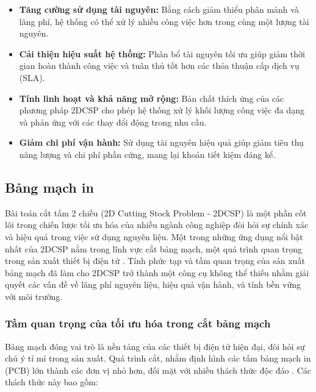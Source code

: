 \begin{itemize}
    \item \textbf{Tăng cường sử dụng tài nguyên:} Bằng cách giảm thiểu phân mảnh và lãng phí, hệ thống có thể xử lý nhiều công việc hơn trong cùng một lượng tài nguyên.  
    \item \textbf{Cải thiện hiệu suất hệ thống:} Phân bổ tài nguyên tối ưu giúp giảm thời gian hoàn thành công việc và tuân thủ tốt hơn các thỏa thuận cấp dịch vụ (SLA).  
    \item \textbf{Tính linh hoạt và khả năng mở rộng:} Bản chất thích ứng của các phương pháp 2DCSP cho phép hệ thống xử lý khối lượng công việc đa dạng và phản ứng với các thay đổi động trong nhu cầu.  
    \item \textbf{Giảm chi phí vận hành:} Sử dụng tài nguyên hiệu quả giúp giảm tiêu thụ năng lượng và chi phí phần cứng, mang lại khoản tiết kiệm đáng kể.  
\end{itemize}  


\subsection{Bảng mạch in}

\hspace{0.5cm}Bài toán cắt tấm 2 chiều (2D Cutting Stock Problem - 2DCSP) là một phần cốt lõi trong chiến lược tối ưu hóa của nhiều ngành công nghiệp đòi hỏi sự chính xác và hiệu quả trong việc sử dụng nguyên liệu. Một trong những ứng dụng nổi bật nhất của 2DCSP nằm trong lĩnh vực cắt bảng mạch, một quá trình quan trọng trong sản xuất thiết bị điện tử \cite{ulutas2023effectiveness}. Tính phức tạp và tầm quan trọng của sản xuất bảng mạch đã làm cho 2DCSP trở thành một công cụ không thể thiếu nhằm giải quyết các vấn đề về lãng phí nguyên liệu, hiệu quả vận hành, và tính bền vững với môi trường.

\subsubsection{Tầm quan trọng của tối ưu hóa trong cắt bảng mạch}
\hspace{0.5cm}Bảng mạch đóng vai trò là nền tảng của các thiết bị điện tử hiện đại, đòi hỏi sự chú ý tỉ mỉ trong sản xuất. Quá trình cắt, nhằm định hình các tấm bảng mạch in (PCB) lớn thành các đơn vị nhỏ hơn, đối mặt với nhiều thách thức độc đáo \cite{ulutas2023effectiveness}. Các thách thức này bao gồm:

